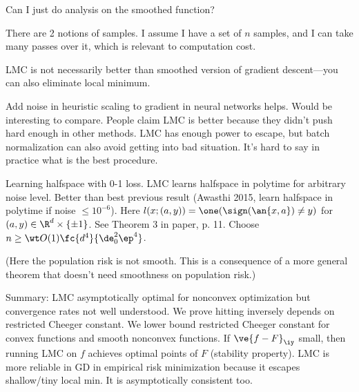 Can I just do analysis on the smoothed function?

There are 2 notions of samples. I assume I have a set of $n$ samples, and I can take many passes over it, which is relevant to computation cost.

LMC is not necessarily better than smoothed version of gradient descent---you can also eliminate local minimum.


Add noise in heuristic scaling to gradient  in neural networks helps. Would be interesting to compare. People claim LMC is better because they didn't push hard enough in other methods. LMC has enough power to escape, but batch normalization can also avoid getting into bad situation. It's hard to say in practice what is the best procedure.

Learning halfspace with 0-1 loss. LMC learns halfspace in polytime for arbitrary noise level. Better than best previous result (Awasthi 2015, learn halfspace in polytime if noise $\le 10^{-6}$). Here $l(x;(a,y))=\one(\sign(\an{x,a})\ne y)$ for $(a,y)\in \R^d\times\{\pm 1\}$. See Theorem 3 in paper, p. 11.  Choose $n\ge \wt O(1) \fc{d^4}{\de_0^2\ep^4}$.


(Here the population risk is not smooth. This is a consequence of a more general theorem that doesn't need smoothness on population risk.)


Summary: LMC asymptotically optimal for nonconvex optimization but convergence rates not well understood. We prove hitting inversely depends on restricted Cheeger constant. We lower bound restricted Cheeger constant for convex functions and smooth nonconvex functions. If $\ve{f-F}_\iy$ small, then running LMC on $f$ achieves optimal points of $F$ (stability property). LMC is more reliable in GD in empirical risk minimization because it escapes shallow/tiny local min. It is asymptotically consistent too. 


%

\printbibliography
